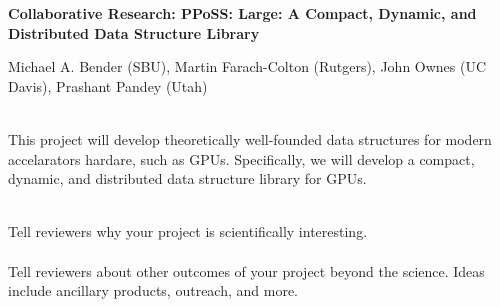 \begin{center}
\bf
\Large
Collaborative Research: PPoSS: Large: A Compact, Dynamic, and Distributed Data
Structure Library 

\medskip
\small
Michael A. Bender (SBU), Martin Farach-Colton (Rutgers), John Ownes (UC Davis),
Prashant Pandey (Utah)
\end{center}


\\

\noindent This project will develop theoretically well-founded data structures for modern accelarators hardare, such as GPUs. Specifically, we will develop a compact, dynamic, and distributed data structure library for GPUs.


\\

\noindent Tell reviewers why your project is scientifically interesting.\\

\\

\noindent Tell reviewers about other outcomes of your project beyond the science. Ideas include ancillary products, outreach, and more.
